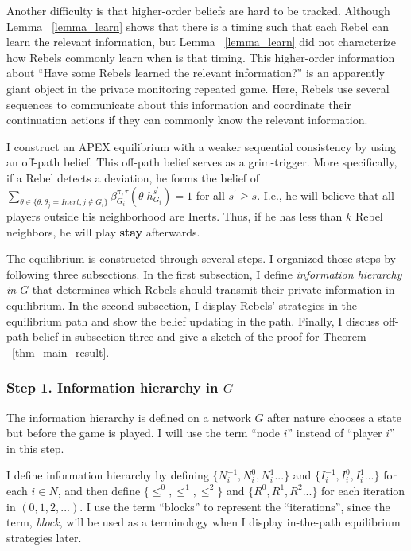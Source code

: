 \documentclass[12pt,letterpaper]{article}
\theoremstyle{definition}
\theoremstyle{remark}
\theoremstyle{claim}
\begin{document}
Another difficulty is that higher-order beliefs are hard to be tracked.  Although Lemma ~\ref{lemma_learn} shows that there is a timing such that each Rebel can learn the relevant information, but Lemma ~\ref{lemma_learn}  did not characterize how Rebels commonly learn when is that timing. This higher-order information about ``Have some Rebels learned the relevant information?'' is an apparently giant object in the private monitoring repeated game. Here, Rebels use several sequences to communicate about this information and coordinate their continuation actions if they can commonly know the relevant information.

I construct an APEX equilibrium with a weaker sequential consistency by using an off-path belief. This off-path belief serves as  a grim-trigger. More specifically, if a Rebel detects a deviation, he forms the belief of $\sum_{\theta \in \{\theta:\theta_j=Inert,j\notin G_i\}}\beta^{\pi,\tau}_{G_i}({\theta}|h^{s^{'}}_{G_i})=1$ for all $s^{'}\geq s$. I.e., he will believe that all players outside his neighborhood are Inerts. Thus, if he has less than $k$ Rebel neighbors, he will play \textbf{stay} afterwards. 

The equilibrium is constructed through several steps. I organized those steps by following three subsections. In the first subsection, I define \textit{information hierarchy in $G$} that determines which Rebels should transmit their private information in equilibrium. In the second subsection, I display Rebels' strategies in the equilibrium path and show the belief updating in the path. Finally, I discuss off-path belief in subsection three and give a sketch of the proof for Theorem ~\ref{thm_main_result}. 

\subsubsection{Step 1. Information hierarchy in $G$}

The information hierarchy is defined on a network $G$ after nature chooses a state but before the game is played. I will use the term ``node $i$'' instead of ``player $i$'' in this step. 

I define information hierarchy by defining $\{N^{-1}_i,N^{0}_i, N^{1}_i...\}$ and $\{I^{-1}_i,I^{0}_i, I^{1}_i...\}$ for each $i\in N$, and then define $\{\leq^0, \leq^1, \leq^2\}$ and $\{R^0,R^{1}, R^{2}...\}$ for each iteration in $(0,1,2,...)$. I use the term ``blocks'' to represent the ``iterations'', since the term, \textit{block}, will be used as a terminology when I display in-the-path equilibrium strategies later. 
\end{document}
